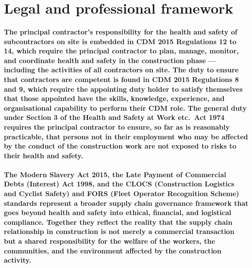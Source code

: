 \section{Legal and professional framework}

\paragraph{The principal contractor's responsibility for the health and safety of subcontractors on site is embedded in CDM 2015 Regulations 12 to 14, which require the principal contractor to plan, manage, monitor, and coordinate health and safety in the construction phase --- including the activities of all contractors on site. The duty to ensure that contractors are competent is found in CDM 2015 Regulations 8 and 9, which require the appointing duty holder to satisfy themselves that those appointed have the skills, knowledge, experience, and organisational capability to perform their CDM role. The general duty under Section 3 of the Health and Safety at Work etc.\ Act 1974 requires the principal contractor to ensure, so far as is reasonably practicable, that persons not in their employment who may be affected by the conduct of the construction work are not exposed to risks to their health and safety.}

\paragraph{The Modern Slavery Act 2015, the Late Payment of Commercial Debts (Interest) Act 1998, and the CLOCS (Construction Logistics and Cyclist Safety) and FORS (Fleet Operator Recognition Scheme) standards represent a broader supply chain governance framework that goes beyond health and safety into ethical, financial, and logistical compliance. Together they reflect the reality that the supply chain relationship in construction is not merely a commercial transaction but a shared responsibility for the welfare of the workers, the communities, and the environment affected by the construction activity.}

